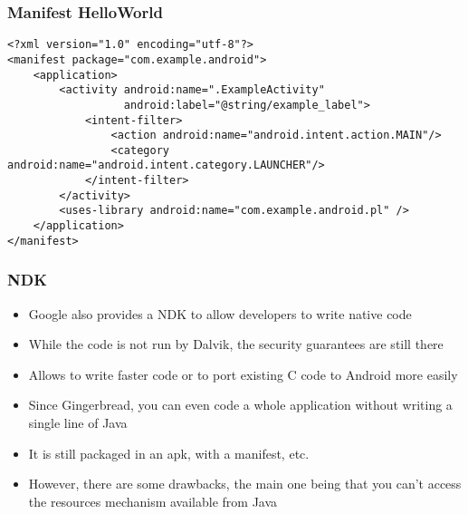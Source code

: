 \begin{frame}[fragile]
  \frametitle{Manifest HelloWorld}
\begin{verbatim}
<?xml version="1.0" encoding="utf-8"?>
<manifest package="com.example.android">
    <application>
        <activity android:name=".ExampleActivity"
                  android:label="@string/example_label">
            <intent-filter>
                <action android:name="android.intent.action.MAIN"/>
                <category android:name="android.intent.category.LAUNCHER"/>
            </intent-filter>
        </activity>
        <uses-library android:name="com.example.android.pl" />
    </application>
</manifest>
\end{verbatim}
\end{frame}

\begin{frame}
  \frametitle{NDK}
  \begin{itemize}
  \item Google also provides a NDK to allow developers to write native
    code
  \item While the code is not run by Dalvik, the security guarantees
    are still there
  \item Allows to write faster code or to port existing C code to
    Android more easily
  \item Since Gingerbread, you can even code a whole application
    without writing a single line of Java
  \item It is still packaged in an apk, with a manifest, etc.
  \item However, there are some drawbacks, the main one being that you
    can't access the resources mechanism available from Java
  \end{itemize}
\end{frame}
